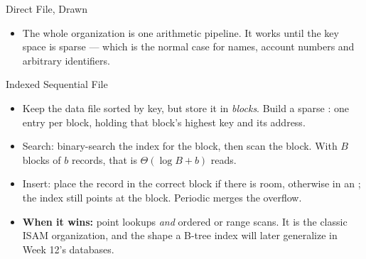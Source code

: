 \documentclass[aspectratio=169]{beamer}
\begin{document}
\begin{frame}{Direct File, Drawn}
  \begin{center}
  \end{center}
  \vspace{-0.1cm}
  \begin{itemize}
    \item The whole organization is one arithmetic pipeline. It works until
      the key space is sparse --- which is the normal case for names, account
      numbers and arbitrary identifiers.
  \end{itemize}
\end{frame}

\begin{frame}{Indexed Sequential File}
  \begin{itemize}
    \item Keep the data file sorted by key, but store it in \emph{blocks}.
      Build a sparse : one entry per block, holding that block's
      highest key and its address.
    \item Search: binary-search the index for the block, then scan the block.
      With $B$ blocks of $b$ records, that is $\Theta(\log B + b)$ reads.
    \item Insert: place the record in the correct block if there is room,
      otherwise in an ; the index still points at the
      block. Periodic  merges the overflow.
    \item \textbf{When it wins:} point lookups \emph{and} ordered or range
      scans. It is the classic ISAM organization, and the shape a B-tree index
      will later generalize in Week 12's databases.
  \end{itemize}
\end{frame}
\end{document}
